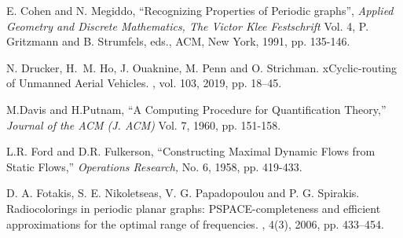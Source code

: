 \begin{thebibliography}{HMRR93}
\iffalse
\bibitem[CM93]{CM93} 
E. Cohen and  N. Megiddo,
``Strongly Polynomial-time and NC Algorithms for 
Detecting Cycles in Dynamic Graphs,''
{\em Proc. 21st ACM Annual Symposium on Theory of Computing (STOC)}, 
1989, pp. 523-534. 
Journal version  appears in {\em Journal of the ACM (J. ACM)} Vol. 40,
No. 4, September 1993, pp. 791-830.
\fi


E. Cohen and N. Megiddo,
``Recognizing Properties of Periodic graphs'',
{\em Applied Geometry and Discrete Mathematics, The Victor Klee Festschrift}
Vol. 4, P. Gritzmann and B. Strumfels, eds., ACM, New York, 1991, pp. 135-146.




\iffalse
\bibitem[CF+93]{CF+93} A. Condon, J. Feigenbaum, C. Lund and P. Shor,
``Probabilistically Checkable Debate Systems and Approximation Algorithms
for {PSPACE}-hard Functions'', in  
{\em Proc.  25th ACM Symposium on Theory of Computing (STOC)}, 
1993, pp. 305-313.


\bibitem[CF+94]{CF+94} A. Condon, J. Feigenbaum, C. Lund and P. Shor,
``Random Debators and the Hardness of Approximating
Stochastic functions for {PSPACE}-hard Functions,'' 
{\em Proc. 9th IEEE Annual Conference on Structure in Complexity Theory}, 
June 1994, pp. 280-293. 
\fi

\newblock N. Drucker, H.~M. Ho, J. Ouaknine, M. Penn and O. Strichman.
\newblock xCyclic-routing of Unmanned Aerial Vehicles.
,
vol. 103, 2019, pp. 18--45.

M.Davis and H.Putnam, 
``A Computing Procedure for Quantification Theory,''
{\em Journal of the ACM (J. ACM)} 
Vol. 7, 1960, pp. 151-158.




\iffalse
\bibitem[DLR79]{DLR79}
D. Dobkin, R.J. Lipton and S. Reiss,
``Linear programming is log-space hard for P'',
{\em Information Processing Letters (IPL)} 
Vol. 8, 1979, pp. 96-97.
\fi


L.R. Ford and D.R. Fulkerson,
``Constructing Maximal Dynamic Flows from Static Flows,''
{\em Operations Research,}
No. 6, 1958, pp. 419-433.


D. A. Fotakis, S. E. Nikoletseas, V. G. Papadopoulou and P. G. Spirakis.
\newblock Radiocolorings in periodic planar graphs: {PSPACE}-completeness 
and efficient approximations for the optimal range of frequencies.
, 4(3), 2006, pp. 433--454.



\end{thebibliography}
